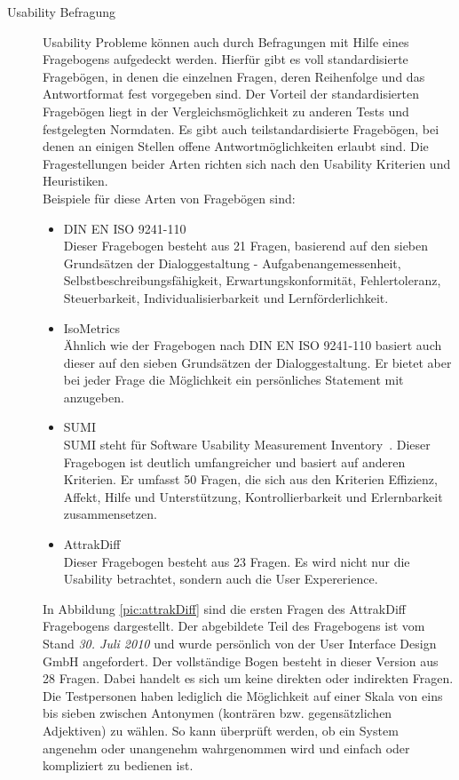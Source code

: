 \begin{description}
\item[Usability Befragung]

Usability Probleme können auch durch Befragungen mit Hilfe eines Fragebogens aufgedeckt werden. Hierfür gibt es voll standardisierte Fragebögen, in denen die einzelnen Fragen, deren Reihenfolge und das Antwortformat fest vorgegeben sind.  Der Vorteil der standardisierten Fragebögen liegt in der Vergleichsmöglichkeit zu anderen Tests und festgelegten Normdaten. Es gibt auch teilstandardisierte Fragebögen, bei denen an einigen Stellen offene Antwortmöglichkeiten erlaubt sind. Die Fragestellungen beider Arten richten sich nach den Usability Kriterien und Heuristiken. \\
Beispiele für diese Arten von Fragebögen sind:
\begin{itemize}
\item DIN EN ISO 9241-110 \\
Dieser Fragebogen besteht aus 21 Fragen, basierend auf den sieben Grundsätzen der Dialoggestaltung - Aufgabenangemessenheit, Selbstbeschreibungsfähigkeit, Erwartungskonformität, Fehlertoleranz, Steuerbarkeit, Individualisierbarkeit und Lernförderlichkeit. 
\item IsoMetrics\\
Ähnlich wie der Fragebogen nach DIN EN ISO 9241-110 basiert auch dieser auf den sieben Grundsätzen der Dialoggestaltung. Er bietet aber bei jeder Frage die Möglichkeit ein persönliches Statement mit anzugeben.
\item SUMI\\
SUMI steht für \glqq Software Usability Measurement Inventory\grqq\ . Dieser Fragebogen ist deutlich umfangreicher und basiert auf anderen Kriterien. Er umfasst 50 Fragen, die sich aus den Kriterien Effizienz, Affekt, Hilfe und Unterstützung, Kontrollierbarkeit und Erlernbarkeit zusammensetzen. 
\item AttrakDiff\\
Dieser Fragebogen besteht aus 23 Fragen. Es wird nicht nur die Usability betrachtet, sondern auch die User Expererience. 
\end{itemize}
In Abbildung \ref{pic:attrakDiff} sind die ersten Fragen des AttrakDiff Fragebogens dargestellt. Der abgebildete Teil des Fragebogens ist vom Stand \textit{30. Juli 2010} und wurde persönlich von der User Interface Design GmbH angefordert. Der vollständige Bogen besteht in dieser Version aus 28 Fragen. Dabei handelt es sich um keine direkten oder indirekten Fragen. Die Testpersonen haben lediglich die Möglichkeit auf einer Skala von eins bis sieben zwischen Antonymen (konträren bzw. gegensätzlichen Adjektiven) zu wählen. So kann überprüft werden, ob ein System angenehm oder unangenehm wahrgenommen wird und einfach oder kompliziert zu bedienen ist.  \\

\end{description}
